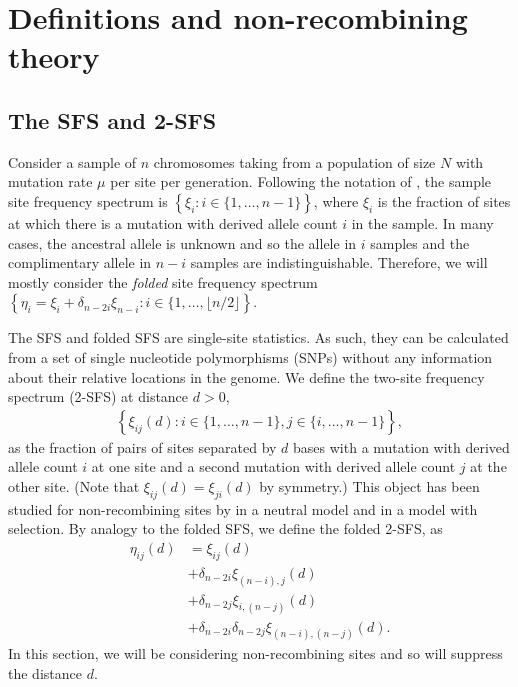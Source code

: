 \documentclass[11pt, letterpaper]{article}   	%
\newcommand{\floor}[1]{\lfloor #1 \rfloor}
\begin{document}
\section*{Definitions and non-recombining theory}

\subsection*{The SFS and 2-SFS}
Consider a sample of $n$ chromosomes taking from a population of size $N$ with mutation rate $\mu$ per site per generation.
Following the notation of \cite{Fu1995}, the sample site frequency spectrum is $\left\{ \xi_i : i \in \{1,\ldots,n-1\} \right\}$, where $\xi_i$ is the fraction of sites at which there is a mutation with derived allele count $i$ in the sample.
In many cases, the ancestral allele is unknown and so the allele in $i$ samples and the complimentary allele in $n-i$ samples are indistinguishable.
Therefore, we will mostly consider the \textit{folded} site frequency spectrum $\left\{ \eta_i = \xi_i + \delta_{n-2i} \xi_{n-i}: i \in \{1, \ldots, \floor{n/2} \right\}$. %

The SFS and folded SFS are single-site statistics.
As such, they can be calculated from a set of single nucleotide polymorphisms (SNPs) without any information about their relative locations in the genome.
We define the two-site frequency spectrum (2-SFS) at distance $d > 0$,
\begin{align*}
    \left\{ \xi_{ij}(d) : i \in \{1, \ldots, n-1\}, j \in \{i, \ldots, n-1\} \right\},
\end{align*}
as the fraction of pairs of sites separated by $d$ bases with a mutation with derived allele count $i$ at one site and a second mutation with derived allele count $j$ at the other site.
(Note that $\xi_{ij}(d) = \xi_{ji}(d)$ by symmetry.)
This object has been studied for non-recombining sites by \cite{FerrettiEtAl2018} in a neutral model and \cite{Xie2011} in a model with selection.
By analogy to the folded SFS, we define the folded 2-SFS, as
\begin{align*}
    \eta_{ij}(d) &= \xi_{ij}(d) \\
                 &+ \delta_{n-2i} \xi_{(n-i),j}(d) \\
                 &+ \delta_{n-2j} \xi_{i,(n-j)}(d) \\
                 &+ \delta_{n-2i} \delta_{n-2j} \xi_{(n-i),(n-j)}(d).
\end{align*}
In this section, we will be considering non-recombining sites and so will suppress the distance $d$.
\end{document}
